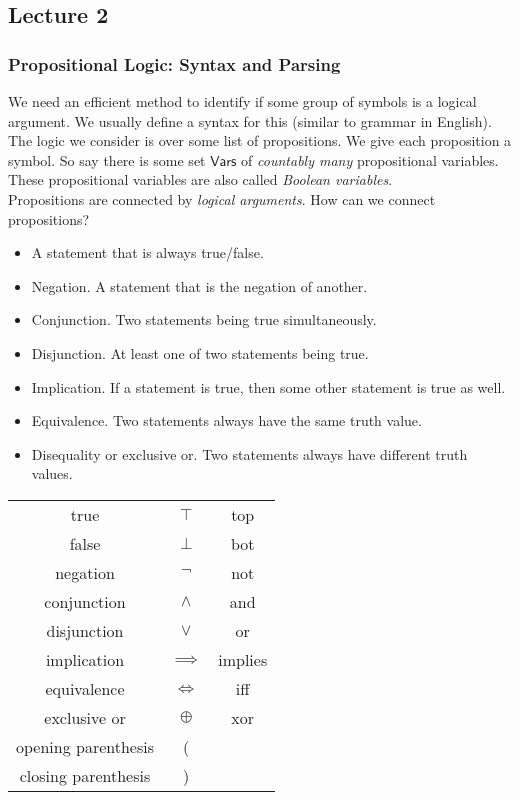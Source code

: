 
\subsection{Lecture 2}

\subsubsection{Propositional Logic: Syntax and Parsing}

We need an efficient method to identify if some group of symbols is a logical argument. We usually define a syntax for this (similar to grammar in English).\\

The logic we consider is over some list of propositions. We give each proposition a symbol. So say there is some set $\mathsf{Vars}$ of \textit{countably many} propositional variables.
These propositional variables are also called \textit{Boolean variables}.\\
Propositions are connected by \textit{logical arguments}. How can we connect propositions?
\begin{itemize}
	\item A statement that is always true/false.
	\item Negation. A statement that is the negation of another.
	\item Conjunction. Two statements being true simultaneously.
	\item Disjunction. At least one of two statements being true.
	\item Implication. If a statement is true, then some other statement is true as well.
	\item Equivalence. Two statements always have the same truth value.
	\item Disequality or exclusive or. Two statements always have different truth values.
\end{itemize}

\begin{center}
\begin{tabular}{c|c|c}
	 true & $\top$ & top  \\
	 false & $\bot$ & bot \\
	 negation & $\neg$ & not \\
	 conjunction & $\wedge$ & and \\
	 disjunction & $\vee$ & or \\
	 implication & $\implies$ & implies \\
	 equivalence & $\iff$ & iff \\
	 exclusive or & $\oplus$ & xor \\
	 opening parenthesis & ( & \\
	 closing parenthesis & ) &
\end{tabular}
\end{center}

